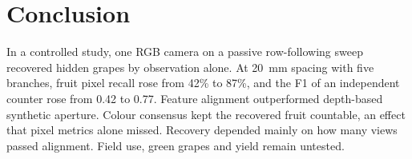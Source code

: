 \section{Conclusion}
In a controlled study, one RGB camera on a passive row-following sweep recovered hidden grapes by observation alone. At 20~mm spacing with five branches, fruit pixel recall rose from 42\% to 87\%, and the F1 of an independent counter rose from 0.42 to 0.77. Feature alignment outperformed depth-based synthetic aperture. Colour consensus kept the recovered fruit countable, an effect that pixel metrics alone missed. Recovery depended mainly on how many views passed alignment. Field use, green grapes and yield remain untested.
